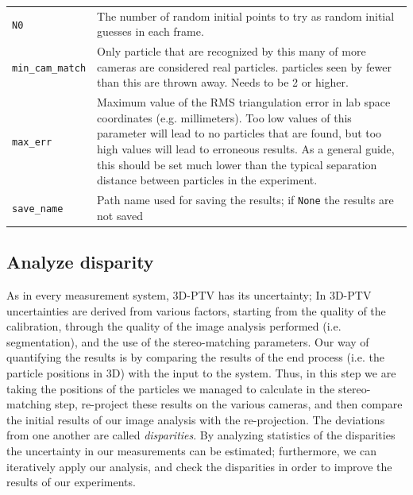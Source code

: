 \documentclass[10pt,a4paper]{article}
\begin{document}
\begin{table}[!ht]
\begin{tabular}{l m{13cm}}
		\texttt{N0} &  The number of random initial points to try as random initial guesses in each frame.\\[.1cm]
		
		\texttt{min\_cam\_match} & Only particle that are recognized by this many of more cameras are considered real particles. particles seen by fewer than this are thrown away. Needs to be 2 or higher. \\[.1cm]
		
		\texttt{max\_err} & Maximum value of the RMS triangulation error in lab space coordinates (e.g. millimeters). Too low values of this parameter will lead to no particles that are found, but too high values will lead to erroneous results. As a general guide, this should be set much lower than the typical separation distance between particles in the experiment.  \\[.1cm]
		
		\texttt{save\_name} & Path name used for saving the results; if \texttt{None} the results are not saved \\[.1cm]
		
		\hline
	\end{tabular}
\end{table}







\subsection{Analyze disparity}\label{sec:workflow_analyze_disparity}


As in every measurement system, 3D-PTV has its uncertainty; In 3D-PTV uncertainties are derived from various factors, starting from the quality of the calibration, through the quality of the image analysis performed (i.e. segmentation), and the use of the stereo-matching parameters. Our way of quantifying the results is by comparing the results of the end process (i.e. the particle positions in 3D) with the input to the system. Thus, in this step we are taking the positions of the particles we managed to calculate in the stereo-matching step, re-project these results on the various cameras, and then compare the initial results of our image analysis with the re-projection. The deviations from one another are called \textit{disparities}.
By analyzing statistics of the disparities the uncertainty in our measurements can be estimated; furthermore, we can iteratively apply our analysis, and check the disparities in order to improve the results of our experiments.
\end{document}
